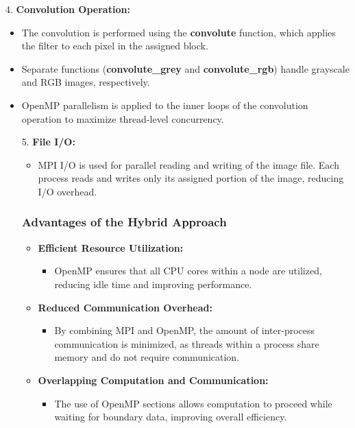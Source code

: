 \documentclass[conference, 10pt]{IEEEtran}
\begin{document}
4. \textbf{Convolution Operation:}
\begin{itemize}

\item The convolution is performed using the \textbf{convolute} function, which applies the filter to each pixel in the assigned block.
\item Separate functions (\textbf{convolute_grey} and \textbf{convolute_rgb}) handle grayscale and RGB images, respectively.
\item OpenMP parallelism is applied to the inner loops of the convolution operation to maximize thread-level concurrency.

5. \textbf{File I/O:}
\begin{itemize}
    \item MPI I/O is used for parallel reading and writing of the image file. Each process reads and writes only its assigned portion of the image, reducing I/O overhead.
\end{itemize}



\subsubsection{Advantages of the Hybrid Approach}

\begin{itemize}
    
    \item \textbf{Efficient Resource Utilization:} 
    \begin{itemize}
    
    \item OpenMP ensures that all CPU cores within a node are utilized, reducing idle time and improving performance.

    \end{itemize}
    

    \item \textbf{Reduced Communication Overhead:} 
    \begin{itemize}
    
    \item By combining MPI and OpenMP, the amount of inter-process communication is minimized, as threads within a process share memory and do not require communication.
    \end{itemize}
    \item \textbf{Overlapping Computation and Communication:} 
    \begin{itemize}
    \item The use of OpenMP sections allows computation to proceed while waiting for boundary data, improving overall efficiency.
    \end{itemize}


\end{itemize}
\end{itemize}
\end{document}
